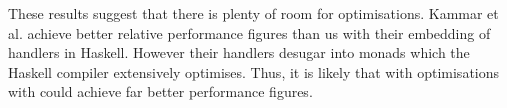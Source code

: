 These results suggest that there is plenty of room for optimisations. Kammar et al. achieve better relative performance figures than us \cite{Kammar2013} with their embedding of handlers in Haskell. However their handlers desugar into monads which the Haskell compiler extensively optimises. Thus, it is likely that with optimisations with could achieve far better performance figures.